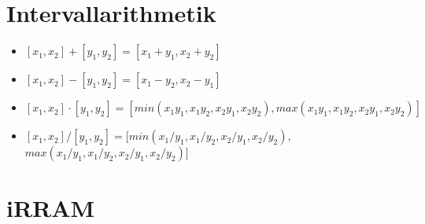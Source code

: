 \section{Intervallarithmetik}

\begin{itemize}
    \item[] $[x_1, x_2] + [y_1, y_2] = [x_1 + y_1, x_2 + y_2]$
    \item[] $[x_1, x_2] - [y_1, y_2] = [x_1 - y_2, x_2 - y_1]$
    \item[] $[x_1, x_2] \cdot [y_1, y_2] = [min(x_1 y_1, x_1 y_2, x_2 y_1, x_2 y_2), max(x_1 y_1, x_1 y_2, x_2 y_1, x_2 y_2)]$
    \item[] $[x_1, x_2] / [y_1, y_2] = [min(x_1 / y_1, x_1 / y_2, x_2 / y_1, x_2 / y_2),$\\ $max(x_1 /y_1, x_1 /y_2, x_2 /y_1, x_2 /y_2)]$
\end{itemize}



\section{iRRAM}

























 

